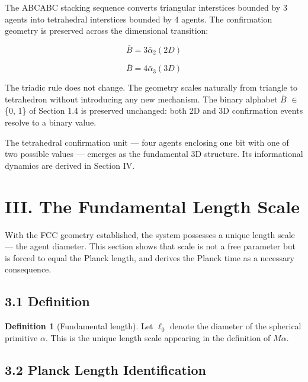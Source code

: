 \documentclass[11pt,oneside]{report}
\theoremstyle{definition}
\newtheorem{definition}[theorem]{Definition}
\theoremstyle{remark}
\begin{document}
The ABCABC stacking sequence converts triangular interstices bounded by
3 agents into tetrahedral interstices bounded by 4 agents. The
confirmation geometry is preserved across the dimensional transition:

\begin{equation*}
\bar{B} = 3\bar{\alpha}_{2} (2D)
\end{equation*}

\begin{equation*}
\bar{B} = 4\bar{\alpha}_{3} (3D)
\end{equation*}

The triadic rule does not change. The geometry scales naturally from
triangle to tetrahedron without introducing any new mechanism. The
binary alphabet \ensuremath{\bar{B}} \ensuremath{\in} \{0, 1\} of Section 1.4 is preserved unchanged: both
2D and 3D confirmation events resolve to a binary value.

The tetrahedral confirmation unit --- four agents enclosing one bit with
one of two possible values --- emerges as the fundamental 3D structure.
Its informational dynamics are derived in Section IV.

\section*{III. The Fundamental Length Scale}

With the FCC geometry established, the system possesses a unique length
scale --- the agent diameter. This section shows that scale is not a
free parameter but is forced to equal the Planck length, and derives the
Planck time as a necessary consequence.

\subsection*{3.1 Definition}

\begin{definition}[Fundamental length]
Let \ensuremath{\ell_{0}} denote the diameter of the
spherical primitive \ensuremath{\alpha .} This is the unique length scale appearing in the
definition of \ensuremath{M\alpha .}
\end{definition}

\subsection*{3.2 Planck Length Identification}
\end{document}
